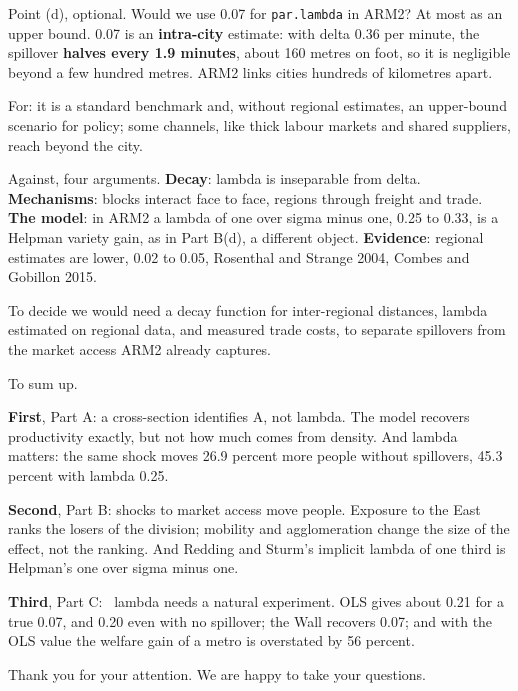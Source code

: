 \begin{say}
 Point (d), optional. Would we use 0.07 for \texttt{par.lambda} in ARM2? At most as an upper bound. 0.07 is an \textbf{intra-city} estimate: with delta 0.36 per minute, the spillover \textbf{halves every 1.9 minutes}, about 160 metres on foot, so it is negligible beyond a few hundred metres. ARM2 links cities hundreds of kilometres apart.

 For: it is a standard benchmark and, without regional estimates, an upper-bound scenario for policy; some channels, like thick labour markets and shared suppliers, reach beyond the city.

 Against, four arguments. \textbf{Decay}: lambda is inseparable from delta. \textbf{Mechanisms}: blocks interact face to face, regions through freight and trade. \textbf{The model}: in ARM2 a lambda of one over sigma minus one, 0.25 to 0.33, is a Helpman variety gain, as in Part B(d), a different object. \textbf{Evidence}: regional estimates are lower, 0.02 to 0.05, Rosenthal and Strange 2004, Combes and Gobillon 2015.

 To decide we would need a decay function for inter-regional distances, lambda estimated on regional data, and measured trade costs, to separate spillovers from the market access ARM2 already captures.
\end{say}

\begin{say}
To sum up.

 \textbf{First}, Part A: a cross-section identifies A, not lambda. The model recovers productivity exactly, but not how much comes from density. And lambda matters: the same shock moves 26.9 percent more people without spillovers, 45.3 percent with lambda 0.25.

 \textbf{Second}, Part B: shocks to market access move people. Exposure to the East ranks the losers of the division; mobility and agglomeration change the size of the effect, not the ranking. And Redding and Sturm's implicit lambda of one third is Helpman's one over sigma minus one.

 \textbf{Third}, Part C: \pause\ lambda needs a natural experiment. OLS gives about 0.21 for a true 0.07, and 0.20 even with no spillover; the Wall recovers 0.07; and with the OLS value the welfare gain of a metro is overstated by 56 percent.

 Thank you for your attention. We are happy to take your questions.
\end{say}

